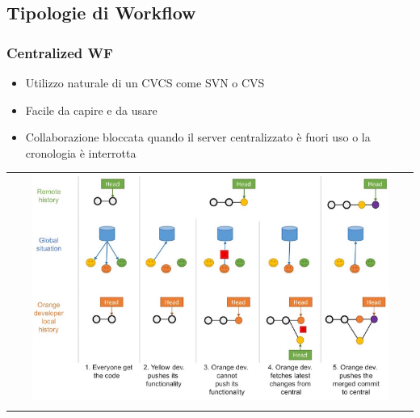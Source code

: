 \subsection{Tipologie di Workflow}

\subsubsection{Centralized WF}
\begin{itemize}
    \item Utilizzo naturale di un CVCS come SVN o CVS
    \item Facile da capire e da usare
    \item Collaborazione bloccata quando il server centralizzato è fuori uso o la cronologia è interrotta
\end{itemize}
\begin{center}
    \begin{tabular}{c}
        \\ \includegraphics[width=0.9\textwidth]{images/VCS1.png} \\ \\
    \end{tabular}
\end{center}

\newpage
